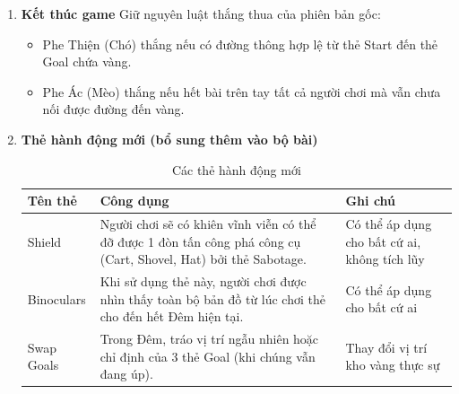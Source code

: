 \begin{enumerate}
\item \textbf{Kết thúc game}
Giữ nguyên luật thắng thua của phiên bản gốc:
\begin{itemize}
\item Phe Thiện (Chó) thắng nếu có đường thông hợp lệ từ thẻ Start đến thẻ Goal chứa vàng.
\item Phe Ác (Mèo) thắng nếu hết bài trên tay tất cả người chơi mà vẫn chưa nối được đường đến vàng.
\end{itemize}
\item \textbf{Thẻ hành động mới (bổ sung thêm vào bộ bài)}
\begin{table}[H]
\centering
\begin{tabular}{|l|p{7cm}|p{5cm}|}
\hline
\textbf{Tên thẻ} & \textbf{Công dụng} & \textbf{Ghi chú} \\ \hline
Shield & Người chơi sẽ có khiên vĩnh viễn có thể đỡ được 1 đòn tấn công phá công cụ (Cart, Shovel, Hat) bởi thẻ Sabotage. & Có thể áp dụng cho bất cứ ai, không tích lũy \\ \hline
Binoculars & Khi sử dụng thẻ này, người chơi được nhìn thấy toàn bộ bản đồ từ lúc chơi thẻ cho đến hết Đêm hiện tại. & Có thể áp dụng cho bất cứ ai\\ \hline
Swap Goals & Trong Đêm, tráo vị trí ngẫu nhiên hoặc chỉ định của 3 thẻ Goal (khi chúng vẫn đang úp). & Thay đổi vị trí kho vàng thực sự \\ \hline
\end{tabular}
\caption{Các thẻ hành động mới}
\end{table}
\end{enumerate}